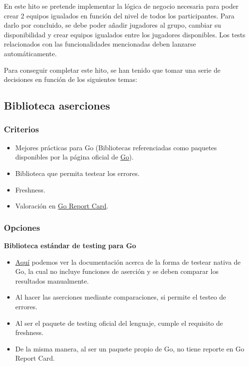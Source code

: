 En este hito se pretende implementar la lógica de negocio necesaria para poder crear 2 equipos igualados en función del nivel de todos los participantes.
Para darlo por concluido, se debe poder añadir jugadores al grupo, cambiar su disponibilidad y crear equipos igualados entre los jugadores disponibles.
Los tests relacionados con las funcionalidades mencionadas deben lanzarse automáticamente.

Para conseguir completar este hito, se han tenido que tomar una serie de decisiones en función de los siguientes temas:

\subsection{Biblioteca aserciones}

\subsubsection{Criterios}

\begin{itemize}
\item
  Mejores prácticas para Go (Bibliotecas referenciadas como paquetes
  disponibles por la página oficial de \href{https://pkg.go.dev/}{Go}).
\item
  Biblioteca que permita testear los errores.
\item
  Freshness.
\item
  Valoración en \href{https://goreportcard.com/}{Go Report Card}.
\end{itemize}

\subsubsection{Opciones}

\textbf{Biblioteca estándar de testing para
Go}

\begin{itemize}
\item
  \href{https://pkg.go.dev/testing}{Aquí} podemos ver la documentación
  acerca de la forma de testear nativa de Go, la cual no incluye
  funciones de aserción y se deben comparar los resultados manualmente.
\item
  Al hacer las aserciones mediante comparaciones, si permite el testeo
  de errores.
\item
  Al ser el paquete de testing oficial del lenguaje, cumple el requisito
  de freshness.
\item
  De la misma manera, al ser un paquete propio de Go, no tiene reporte
  en Go Report Card.
\end{itemize}

